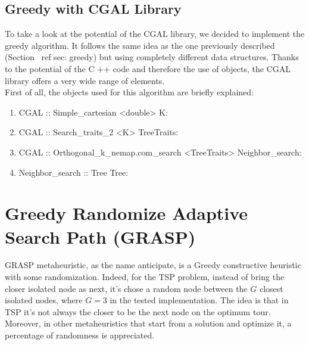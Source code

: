 \subsection{Greedy with CGAL Library}
To take a look at the potential of the CGAL library, we decided to implement the greedy algorithm. It follows the same idea as the one previously described (Section \ ref {sec: greedy}) but using completely different data structures. Thanks to the potential of the C ++ code and therefore the use of objects, the CGAL library offers a very wide range of elements.\\ First of all, the objects used for this algorithm are briefly explained:
\begin{enumerate}
\item CGAL :: Simple\_cartesian <double> K: 
\item CGAL :: Search\_traits\_2 <K> TreeTraits:
\item CGAL :: Orthogonal\_k\_nemap.com\_search <TreeTraits> Neighbor\_search:
\item Neighbor\_search :: Tree Tree:
\end{enumerate}

\section{Greedy Randomize Adaptive Search Path (GRASP)}
GRASP metaheuristic, as the name anticipate, is a Greedy constructive heuristic with some randomization. Indeed, for the TSP problem, instead of bring the closer isolated node as next, it's chose a random node between the $ G $ closest isolated nodes, where $ G = 3 $ in the tested implementation.
The idea is that in TSP it's not always the closer to be the next node on the optimum tour. Moreover, in other metaheuristics that start from a solution and optimize it, a percentage of randomness is appreciated.

